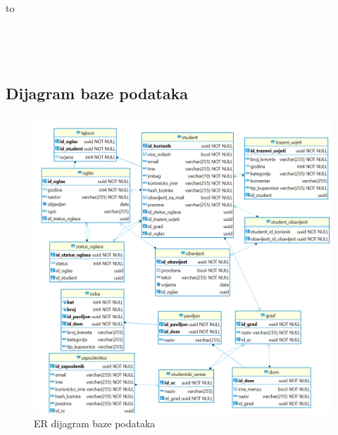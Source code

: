 				
			
				\begin{longtabu} to \textwidth {|X[6, 2]|X[6, 2]|X[20, l]|}
					
					\hline {}	 \\[3pt] \hline
					\endfirsthead
					
					\hline {}	 \\[3pt] \hline
					\endhead
					
					\hline 
					\endlastfoot
					
					
					
					
				\end{longtabu}
		
		
			
			
			\subsection{Dijagram baze podataka}
				\begin{figure}[H]
					\includegraphics[scale=0.4]{dijagrami/ERdijagram.png} %
					\centering
					\caption{ER dijagram baze podataka}
					\label{fig:er}
				\end{figure}
			
